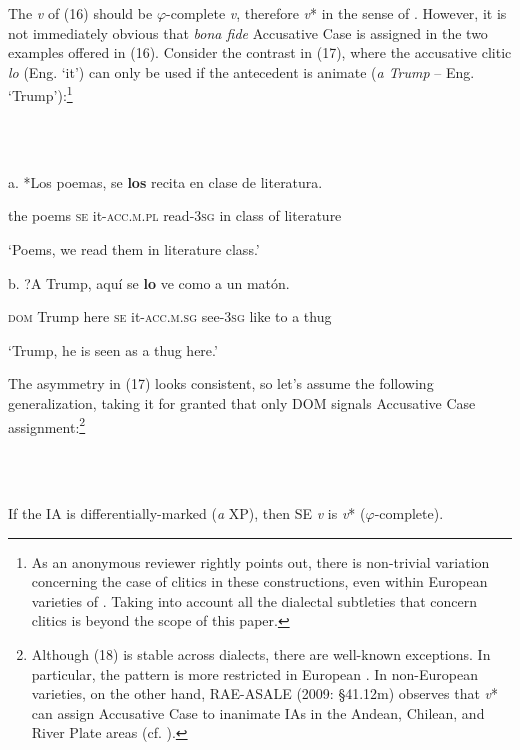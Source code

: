 \documentclass[output=paper]{langsci/langscibook}
\begin{document}
  The \textit{v} of (16) should be $\varphi $-complete \textit{v}, therefore \textit{v}* in the sense of \citet{Chomsky2001}. However, it is not immediately obvious that \textit{bona fide} Accusative Case is assigned in the two examples offered in (16). Consider the contrast in (17), where the accusative clitic \textit{lo} (Eng. ‘it’) can only be used if the antecedent is animate (\textit{a Trump} – Eng. ‘Trump’):\footnote{As an anonymous reviewer rightly points out, there is non-trivial variation concerning the case of clitics in these constructions, even within European varieties of . Taking into account all the dialectal subtleties that concern clitics is beyond the scope of this paper.}

\ea%
    \label{ex:key:17}
    \gll\\
        \\
    \glt
    \z


a.   *Los poemas, se   \textbf{los}                recita        en clase de literatura.            

          the  poems   \textsc{se} it\textsc{{}-acc}.\textsc{m.pl} read\textsc{{}-3}\textsc{sg}  in  class of literature

          ‘Poems, we read them in literature class.’         

b.   ?A        Trump,  aquí  se   \textbf{lo}                   ve           como a   un matón.   

         \textsc{dom} Trump   here  \textsc{se} it\textsc{{}-acc}.\textsc{m.sg} see\textsc{{}-3}\textsc{sg} like    to  a    thug

         ‘Trump, he is seen as a thug here.’ 

The asymmetry in (17) looks consistent, so let’s assume the following generalization, taking it for granted that only DOM signals Accusative Case assignment:\footnote{Although (18) is stable across dialects, there are well-known exceptions. In particular, the pattern is more restricted in European . In non-European varieties, on the other hand, RAE-ASALE (2009: §41.12m) observes that \textit{v}* can assign Accusative Case to inanimate IAs in the Andean, Chilean, and River Plate areas (cf. \citealt{Gallego2016}).}

\ea%
    \label{ex:key:18}
    \gll\\
        \\
    \glt
    \z

          If the IA is differentially-marked (\textit{a} XP), then SE \textit{v} is \textit{v}* ($\varphi $-complete).
\end{document}
